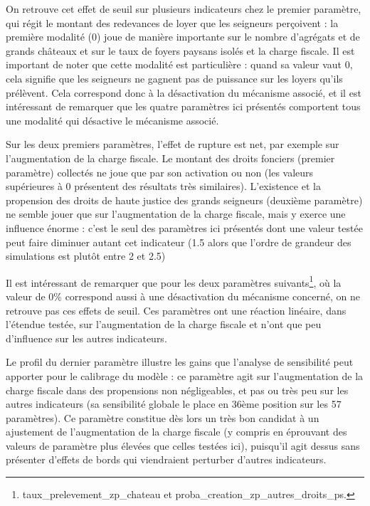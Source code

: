 On retrouve cet effet de seuil sur plusieurs indicateurs chez le premier paramètre, qui régit le montant des redevances de loyer que les seigneurs perçoivent : la première modalité (0) joue de manière importante sur le nombre d'agrégats et de grands châteaux et sur le taux de foyers paysans isolés et la charge fiscale.
Il est important de noter que cette modalité est particulière : quand sa valeur vaut 0, cela signifie que les seigneurs ne gagnent pas de puissance sur les loyers qu'ils prélèvent.
Cela correspond donc à la désactivation du mécanisme associé, et il est intéressant de remarquer que les quatre paramètres ici présentés comportent tous une modalité qui désactive le mécanisme associé.

Sur les deux premiers paramètres, l'effet de rupture est net, par exemple sur l'augmentation de la charge fiscale.
Le montant des droits fonciers (premier paramètre) collectés ne joue que par son activation ou non (les valeurs supérieures à 0 présentent des résultats très similaires).
L'existence et la propension des droits de haute justice des grands seigneurs (deuxième paramètre) ne semble jouer que sur l'augmentation de la charge fiscale, mais y exerce une influence énorme : c'est le seul des paramètres ici présentés dont une valeur testée peut faire diminuer autant cet indicateur (1.5 alors que l'ordre de grandeur des simulations est plutôt entre 2 et 2.5)

Il est intéressant de remarquer que pour les deux paramètres suivants\footnote{
\textsf{taux\_prelevement\_zp\_chateau} et \textsf{proba\_creation\_zp\_autres\_droits\_ps}.
}, où la valeur de 0\% correspond aussi à une désactivation du mécanisme concerné, on ne retrouve pas ces effets de seuil.
Ces paramètres ont une réaction linéaire, dans l'étendue testée, sur l'augmentation de la charge fiscale et n'ont que peu d'influence sur les autres indicateurs.

Le profil du dernier paramètre illustre les gains que l'analyse de sensibilité peut apporter pour le calibrage du modèle : ce paramètre agit sur l'augmentation de la charge fiscale dans des propensions non négligeables, et pas ou très peu sur les autres indicateurs (sa sensibilité globale le place en 36ème position sur les 57 paramètres).
Ce paramètre constitue dès lors un très bon candidat à un ajustement de l'augmentation de la charge fiscale (y compris en éprouvant des valeurs de paramètre plus élevées que celles testées ici), puisqu'il agit dessus sans présenter d'effets de bords qui viendraient perturber d'autres indicateurs.

